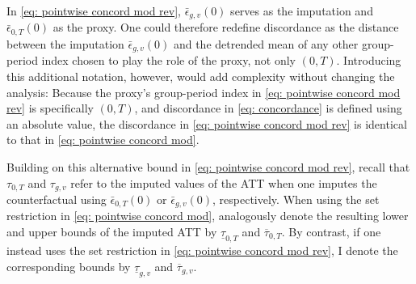 \documentclass[twoside,11pt]{article}
\begin{document}
In \eqref{eq: pointwise concord mod rev}, $\bar{\epsilon}_{g,v}(0)$ serves as the imputation and $\bar{\epsilon}_{0,T}(0)$ as the proxy. One could therefore redefine discordance as the distance between the imputation $\bar{\epsilon}_{g,v}(0)$ and the detrended mean of any other group-period index chosen to play the role of the proxy, not only $(0,T)$. Introducing this additional notation, however, would add complexity without changing the analysis: Because the proxy's group-period index in \eqref{eq: pointwise concord mod rev} is specifically $(0,T)$, and discordance in \eqref{eq: concordance} is defined using an absolute value, the discordance in \eqref{eq: pointwise concord mod rev} is identical to that in \eqref{eq: pointwise concord mod}.

Building on this alternative bound in \eqref{eq: pointwise concord mod rev}, recall that $\tau_{0,T}$ and $\tau_{g,v}$ refer to the imputed values of the \textrm{ATT} when one imputes the counterfactual using $\bar{\epsilon}_{0,T}(0)$ or $\bar{\epsilon}_{g,v}(0)$, respectively. When using the set restriction in \eqref{eq: pointwise concord mod}, analogously denote the resulting lower and upper bounds of the imputed \textrm{ATT} by $\underline{\tau}_{0,T}$ and $\overline{\tau}_{0,T}$. By contrast, if one instead uses the set restriction in \eqref{eq: pointwise concord mod rev}, I denote the corresponding bounds by $\underline{\tau}_{g,v}$ and $\overline{\tau}_{g,v}$.
\end{document}
